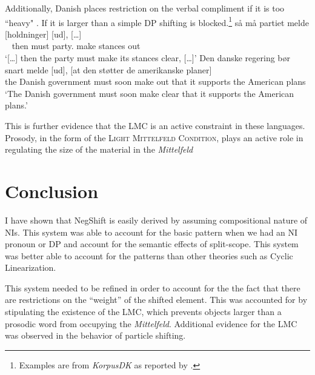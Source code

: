 \documentclass[12pt, letterpaper]{article}
\begin{document}
Additionally, Danish places restriction on the verbal compliment if it is too ``heavy" \citep[44f]{mullerDanishHeadDrivenPhraseInpreparation}. If it is larger than a simple DP shifting is blocked.\footnote{Examples are from \emph{KorpusDK} as reported by \citet{mullerDanishHeadDrivenPhraseInpreparation}.} 
	\ea \gll {[…]} så må partiet melde [holdninger] [ud], {[…]}\\
	~ then must party.\Def{} make stances out\\
	\glt `{[…]} then the party must make its stances clear, {[…]}'
	\ex \gll Den danske regering bør snart melde [ud], [at den støtter de amerikanske planer]\\
	the Danish government must soon make out that it supports the American plans\\
	\glt `The Danish government must soon make clear that it supports the American plans.'
	\z 

This is further evidence that the LMC is an active constraint in these languages. Prosody, in the form of the \textsc{Light Mittelfeld Condition}, plays an active role in regulating the size of the material in the \emph{Mittelfeld}

\section{Conclusion} \label{sec:CONCLUSION}

I have shown that NegShift is easily derived by assuming  compositional nature of NIs. This system was able to account for the basic pattern when we had an NI pronoun or DP and account for the semantic effects of split-scope. This system was better able to account for the patterns than other theories such as Cyclic Linearization. 

This system needed to be refined in order to account for the the fact that there are restrictions on the ``weight'' of the shifted element. This was accounted for by stipulating the existence of the LMC, which prevents objects larger than a prosodic word from occupying the \emph{Mittelfeld}. Additional evidence for the LMC was observed in the behavior of particle shifting. 


\printbibliography[heading=bibintoc]
\end{document}
